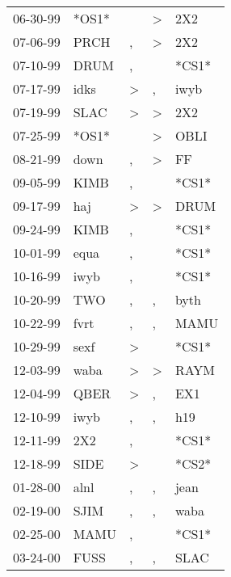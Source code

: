 \begin{supertabular}{lllll}
 06-30-99 &  *OS1* &                  &     \textgreater &    2X2 \\
 07-06-99 &   PRCH &                , &     \textgreater &    2X2 \\
 07-10-99 &   DRUM &                , &                  &  *CS1* \\
 07-17-99 &   idks &     \textgreater &                , &   iwyb \\
 07-19-99 &   SLAC &     \textgreater &     \textgreater &    2X2 \\
 07-25-99 &  *OS1* &                  &     \textgreater &   OBLI \\
 08-21-99 &   down &                , &     \textgreater &     FF \\
 09-05-99 &   KIMB &                , &                  &  *CS1* \\
 09-17-99 &    haj &     \textgreater &     \textgreater &   DRUM \\
 09-24-99 &   KIMB &                , &                  &  *CS1* \\
 10-01-99 &   equa &                , &                  &  *CS1* \\
 10-16-99 &   iwyb &                , &                  &  *CS1* \\
 10-20-99 &    TWO &                , &                , &   byth \\
 10-22-99 &   fvrt &                , &                , &   MAMU \\
 10-29-99 &   sexf &     \textgreater &                  &  *CS1* \\
 12-03-99 &   waba &     \textgreater &     \textgreater &   RAYM \\
 12-04-99 &   QBER &     \textgreater &                , &    EX1 \\
 12-10-99 &   iwyb &                , &                , &    h19 \\
 12-11-99 &    2X2 &                , &                  &  *CS1* \\
 12-18-99 &   SIDE &     \textgreater &                  &  *CS2* \\
 01-28-00 &   alnl &                , &                , &   jean \\
 02-19-00 &   SJIM &                , &                , &   waba \\
 02-25-00 &   MAMU &                , &                  &  *CS1* \\
 03-24-00 &   FUSS &                , &                , &   SLAC \\

\end{supertabular}
